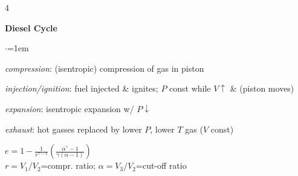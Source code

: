 \documentclass[letterpaper,landscape,10pt]{article}
\newenvironment{titemize}
{\begin{list}{$\cdot$}{\leftmargin=1em}
	\setlength{\itemsep}{0pt}
	\setlength{\parskip}{0pt}
	\setlength{\parsep}{0pt}}
{\end{list}}
\begin{document}
{\begin{multicols}{4}
	  \vspace{5pt}
	  \begin{minipage}{\columnwidth}
	\textbf{Diesel Cycle} \\
	  \begin{minipage}{0.24\columnwidth}
	  \end{minipage}\hspace{.01\columnwidth}
	  \begin{minipage}{0.74\columnwidth}
		  \begin{titemize}
			  \item[1)] \emph{compression}: (isentropic) compression of gas in
				  piston
			  \item[2)] \emph{injection/ignition}: fuel injected \& ignites;
				  $P$ const while $V\uparrow$ \& (piston moves)
			  \item[3)] \emph{expansion}: isentropic expansion w/ $P\downarrow$
			  \item[4)] \emph{exhaust}: hot gasses replaced by lower $P$, lower
				  $T$ gas ($V$ const)
		\end{titemize}
		$e=1-\frac{1}{r^{\gamma-1}}\left ( \frac{\alpha^{\gamma}-1}{\gamma(\alpha-1)} \right )$ \\
		$r=V_1/V_2$=compr. ratio; $\alpha=V_3/V_2$=cut-off ratio
	  \end{minipage}
  \end{minipage}\\


\end{multicols}}
\end{document}
